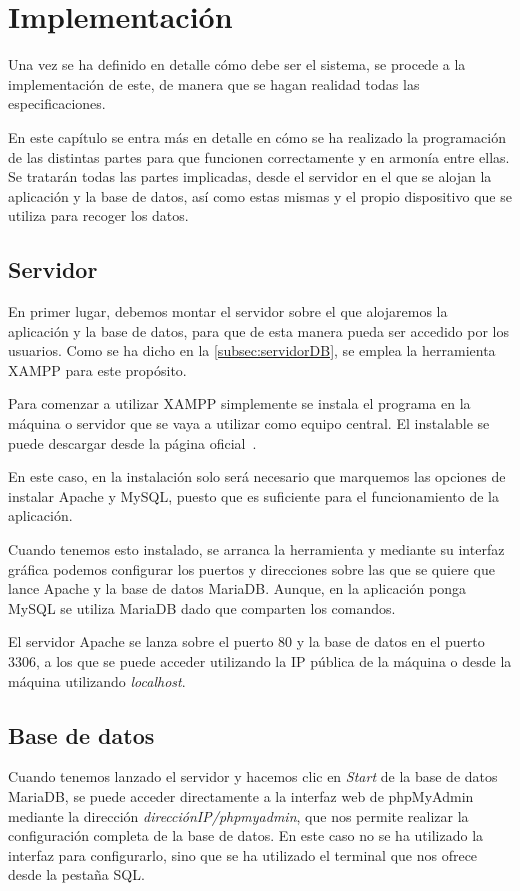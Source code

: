 \chapter{Implementación}
\label{ch:implementacion}
Una vez se ha definido en detalle cómo debe ser el sistema, se procede a la implementación de este, de manera que se hagan realidad todas las especificaciones. 

En este capítulo se entra más en detalle en cómo se ha realizado la programación de las distintas partes para que funcionen correctamente y en armonía entre ellas. Se tratarán todas las partes implicadas, desde el servidor en el que se alojan la aplicación y la base de datos, así como estas mismas y el propio dispositivo que se utiliza para recoger los datos.

\section{Servidor}\label{sec:servidorImpl}
En primer lugar, debemos montar el servidor sobre el que alojaremos la aplicación y la base de datos, para que de esta manera pueda ser accedido por los usuarios. Como se ha dicho en la \autoref{subsec:servidorDB}, se emplea la herramienta XAMPP para este propósito.

Para comenzar a utilizar XAMPP simplemente se instala el programa en la máquina o servidor que se vaya a utilizar como equipo central. El instalable se puede descargar desde la página oficial~\cite{noauthor_xampp_nodate}.

En este caso, en la instalación solo será necesario que marquemos las opciones de instalar Apache y MySQL, puesto que es suficiente para el funcionamiento de la aplicación.

Cuando tenemos esto instalado, se arranca la herramienta y mediante su interfaz gráfica podemos configurar los puertos y direcciones sobre las que se quiere que lance Apache y la base de datos MariaDB. Aunque, en la aplicación ponga MySQL se utiliza MariaDB dado que comparten los comandos.

El servidor Apache se lanza sobre el puerto 80 y la base de datos en el puerto 3306, a los que se puede acceder utilizando la IP pública de la máquina o desde la máquina utilizando \textit{localhost}.

\section{Base de datos}\label{sec:base-de-datos}
Cuando tenemos lanzado el servidor y hacemos clic en \textit{Start} de la base de datos MariaDB, se puede acceder directamente a la interfaz web de phpMyAdmin mediante la dirección \textit{direcciónIP/phpmyadmin}, que nos permite realizar la configuración completa de la base de datos. En este caso no se ha utilizado la interfaz para configurarlo, sino que se ha utilizado el terminal que nos ofrece desde la pestaña SQL\@.
\pagebreak

